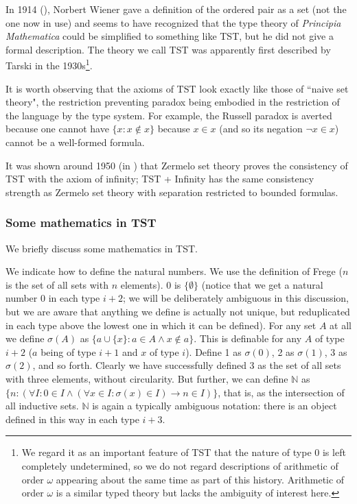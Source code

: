 \documentclass{article}
\theoremstyle{definition}
\theoremstyle{remark}
\begin{document}
{In 1914 (\cite{wiener}), Norbert Wiener gave a definition of the ordered pair as a set (not the one now in use) and seems to have recognized that the type theory of {\em Principia Mathematica\/} could be simplified to something like TST, but he did not give a formal description.  The theory we call TST was apparently first described by Tarski in the 1930s\footnote{We regard it as an important feature of TST that the nature of type 0 is left completely undetermined, so we do not regard descriptions of arithmetic of order $\omega$ appearing about the same time as part of this history.     Arithmetic of order $\omega$ is a similar typed theory but lacks the ambiguity of interest here.}.

It is worth observing that the axioms of TST look exactly like those of ``naive set theory", the restriction preventing paradox being embodied in the restriction of the language by the type system.
For example, the Russell paradox is averted because one cannot have $\{x:x \not\in x\}$ because $x \in x$ (and so its negation $\neg x \in x$) cannot be a well-formed formula.

It was shown around 1950 (in \cite{kemeny}) that Zermelo set theory proves the consistency of TST with the axiom of infinity;  TST + Infinity has the same consistency strength as
Zermelo set theory with separation restricted to bounded formulas.




\newpage

\subsubsection{Some mathematics in TST}

We briefly discuss some mathematics in TST.

We indicate how to define the natural numbers.  We use the definition of Frege ($n$ is the set of all sets with $n$ elements).  0 is $\{\emptyset\}$ (notice that we get a natural number 0 in each type $i+2$;  we will be deliberately ambiguous in this discussion, but we are aware that anything we define is actually not unique, but reduplicated in each type above the lowest one in which it can be defined).  For any set $A$ at all we define $\sigma(A)$ as $\{a \cup \{x\}:a \in A \wedge x \not\in a\}$.  This is definable for any $A$ of type $i+2$ ($a$ being of type $i+1$ and $x$ of type $i$).  Define 1 as $\sigma(0)$, 2 as $\sigma(1)$,  3 as $\sigma(2)$, and so forth.  Clearly we have successfully defined 3 as the set of all sets with three elements, without circularity.
But further, we can define $\mathbb N$ as $\{n:(\forall I:0 \in I \wedge (\forall x \in I:\sigma(x) \in I) \rightarrow n \in I)\}$, that is, as the intersection of all inductive sets.
$\mathbb N$ is again a typically ambiguous notation:  there is an object defined in this way in each type $i+3$.

}
\end{document}
